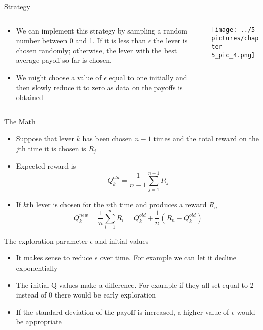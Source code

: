 \documentclass[11pt]{beamer}
\begin{document}
\begin{frame}{Strategy}
\begin{columns}[T] %
\begin{column}{.48\textwidth}
        \begin{itemize}
		\item We can implement this strategy by sampling a random number between 0 and 1. If it is less than $\epsilon$ the lever is chosen randomly; otherwise, the lever with the best average payoff so far is chosen. 
		\item We might choose a value of $\epsilon$ equal to one initially and then slowly reduce it to zero as data on the payoffs is obtained
        \end{itemize}
\end{column}%
\hfill%
\begin{column}{.48\textwidth}
        \texttt{[image: ../5-pictures/chapter-5\_pic\_4.png]}
\end{column}%
\end{columns}
\end{frame}
\begin{frame}{The Math}
	\begin{itemize}
		\item Suppose that lever $k$ has been chosen $n-1$ times and the total reward on the $j$th time it is chosen is $R_j$ 
		\item Expected reward is \begin{equation}Q_k^{old}=\frac{1}{n-1}\sum\limits_{j=1}^{n-1}R_j\end{equation} 
		\item If $k$th lever is chosen for the $n$th time and produces a reward $R_n$ \begin{equation}Q_k^{new}=\frac{1}{n}\sum\limits_{i=1}^n R_i = Q_k^{old}+\frac{1}{n}\left(R_n - Q_k^{old} \right) \end{equation}
	\end{itemize}
\end{frame}
\begin{frame}{The exploration parameter $\epsilon$ and initial values}
	\begin{itemize}
		\item It makes sense to reduce $\epsilon$ over time. For example we can let it decline exponentially
		\item The initial Q-values make a difference. For example if they all set equal to 2 instead of 0 there would be early exploration
		\item If the standard deviation of the payoff is increased, a higher value of $\epsilon$ would be appropriate 
	\end{itemize}
\end{frame}
\end{document}

